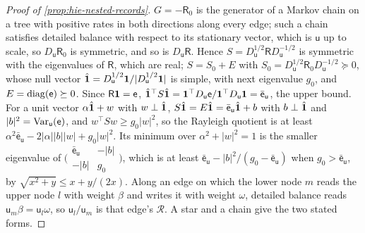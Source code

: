 \begin{proof}[Proof of \cref{prop:hie-nested-records}]
$G=-\mathsf R_0$ is the generator of a Markov chain on a tree with positive rates in both directions along every edge; such a chain satisfies detailed balance with respect to its stationary vector, which is $\mathsf u$ up to scale, so $D_{\mathsf u}\mathsf R_0$ is symmetric, and so is $D_{\mathsf u}\mathsf R$. Hence $S=D_{\mathsf u}^{1/2}\mathsf RD_{\mathsf u}^{-1/2}$ is symmetric with the eigenvalues of $\mathsf R$, which are real; $S=S_0+E$ with $S_0=D_{\mathsf u}^{1/2}\mathsf R_0D_{\mathsf u}^{-1/2}\succeq0$, whose null vector $\hat{\mathbf{1}}=D_{\mathsf u}^{1/2}\mathbf{1}/\lvert D_{\mathsf u}^{1/2}\mathbf{1}\rvert$ is simple, with next eigenvalue $g_0$, and $E=\operatorname{diag}(\mathsf e)\succeq0$. Since $\mathsf R\mathbf{1}=\mathsf e$, $\hat{\mathbf{1}}^\top S\hat{\mathbf{1}}=\mathbf{1}^\top D_{\mathsf u}\mathsf e/\mathbf{1}^\top D_{\mathsf u}\mathbf{1}=\bar{\mathsf e}_{\mathsf u}$, the upper bound. For a unit vector $\alpha\hat{\mathbf{1}}+w$ with $w\perp\hat{\mathbf{1}}$, $S\hat{\mathbf{1}}=E\hat{\mathbf{1}}=\bar{\mathsf e}_{\mathsf u}\hat{\mathbf{1}}+b$ with $b\perp\hat{\mathbf{1}}$ and $\lvert b\rvert^2=\operatorname{Var}_{\mathsf u}(\mathsf e)$, and $w^\top Sw\ge g_0\lvert w\rvert^2$, so the Rayleigh quotient is at least $\alpha^2\bar{\mathsf e}_{\mathsf u}-2\lvert\alpha\rvert\lvert b\rvert\lvert w\rvert+g_0\lvert w\rvert^2$. Its minimum over $\alpha^2+\lvert w\rvert^2=1$ is the smaller eigenvalue of $\bigl(\begin{smallmatrix}\bar{\mathsf e}_{\mathsf u}&-\lvert b\rvert\\-\lvert b\rvert&g_0\end{smallmatrix}\bigr)$, which is at least $\bar{\mathsf e}_{\mathsf u}-\lvert b\rvert^2/(g_0-\bar{\mathsf e}_{\mathsf u})$ when $g_0>\bar{\mathsf e}_{\mathsf u}$, by $\sqrt{x^2+y}\le x+y/(2x)$. Along an edge on which the lower node $m$ reads the upper node $l$ with weight $\beta$ and writes it with weight $\omega$, detailed balance reads $\mathsf u_m\beta=\mathsf u_l\omega$, so $\mathsf u_l/\mathsf u_m$ is that edge's $\mathcal R$. A star and a chain give the two stated forms.
\end{proof}

